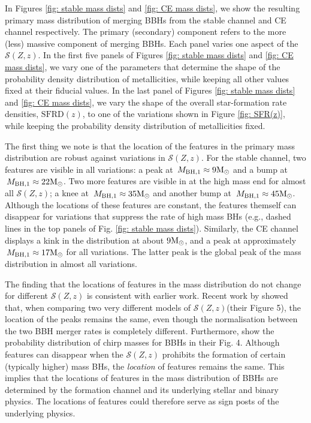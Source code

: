 \documentclass[linenumbers,twocolumn]{aastex631}
\newcommand{\Msun}{\ensuremath{\rm{M}_{\odot}}\xspace}
\newcommand{\Mbheen}{\ensuremath{\,M_{\rm BH, 1}}\xspace}
\newcommand{\SFRDzZ}{\ensuremath{\mathcal{S}(Z,z)}\xspace}
\newcommand{\SFRDz}{\ensuremath{\mathrm{SFRD}(z)}\xspace}
\begin{document}
In Figures \ref{fig: stable mass dists} and \ref{fig: CE mass dists}, we show the resulting primary mass distribution of merging BBHs from the stable channel and CE channel respectively.
The primary (secondary) component refers to the more (less) massive component of merging BBHs. 
Each panel varies one aspect of the \SFRDzZ. In the first five panels of Figures \ref{fig: stable mass dists} and \ref{fig: CE mass dists}, we vary one of the  parameters that determine the shape of the probability density distribution of metallicities, while keeping all other values fixed at their fiducial values. In the last panel of  Figures \ref{fig: stable mass dists} and \ref{fig: CE mass dists}, we vary the shape of the overall star-formation rate densities, \SFRDz, to one of the variations shown in Figure \ref{fig: SFR(z)}, while keeping the probability density distribution of metallicities fixed.


The first thing we note is that the location of the features in the primary mass distribution are robust against variations in \SFRDzZ.
For the stable channel, two features are visible in all variations: a peak at $\Mbheen\approx9\Msun$ and a bump at $\Mbheen\approx22\Msun$. 
Two more features are visible in at the high mass end for almost all \SFRDzZ; a knee at $\Mbheen\approx35\Msun$ and another bump at $\Mbheen\approx45\Msun$. Although the locations of these features are constant, the features themself can disappear for variations that suppress the rate of high mass BHs (e.g., dashed lines in the top panels of Fig. \ref{fig: stable mass dists}).  
Similarly, the CE channel displays a kink in the distribution at about $9\Msun$, and a peak at approximately $\Mbheen\approx17\Msun$ for all variations. The latter peak is the global peak of the mass distribution in almost all variations.  

The finding that the locations of features in the mass distribution do not change for different \SFRDzZ is consistent with earlier work. 
%
Recent work by \cite{chruslinska2022_review} showed that, when comparing two very different models of \SFRDzZ (their Figure 5), the location of the peaks remains the same, even though the normalisation between the two BBH merger rates is completely different. 
%
Furthermore, \cite{Broekgaarden+2021b} show the probability distribution of chirp masses for BBHs in their Fig. 4. Although features can disappear when the \SFRDzZ prohibits the formation of certain (typically higher) mass BHs, the \textit{location} of features remains the same.
%
This implies that the locations of features in the mass distribution of BBHs are determined by the formation channel and its underlying stellar and binary physics. The locations of features could therefore serve as sign posts of the underlying physics. \\
\end{document}

